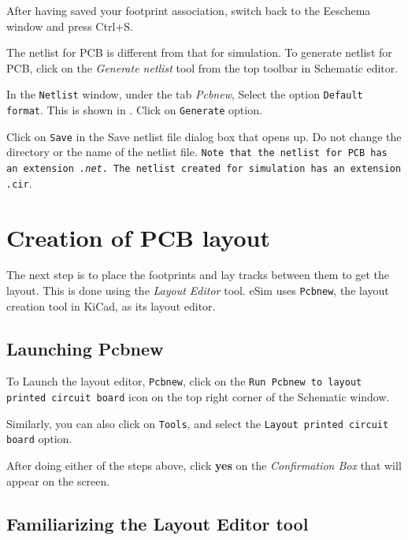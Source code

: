 \begin{compactenum}
\item After having saved your footprint association, switch back to the Eeschema window and press Ctrl+S.
\item The netlist for PCB is different from that for simulation. To generate
netlist for PCB, click on the \textit{Generate netlist} tool from the
top toolbar in Schematic editor.
\item In the \texttt{Netlist} window, under the tab \textit{Pcbnew}, Select the option \texttt{Default format}. This is shown in . Click on \texttt{Generate} option. 
\item Click on \texttt{Save} in the Save netlist file dialog box that opens up. Do not change the directory or the name of the netlist file. \texttt{Note that the netlist for PCB has an extension \emph{.net}. The netlist created for simulation has an extension \emph .cir}.
\end{compactenum}



\section{Creation of PCB layout}
 

The next step is to place the footprints and lay tracks between them
to get the layout. This is done using the \textit{Layout Editor}
tool. eSim uses {\tt Pcbnew}, the layout creation tool in KiCad, as
its layout editor.

\subsection{Launching Pcbnew}
\begin{compactenum}
\item To Launch the layout editor, \texttt{Pcbnew}, click on the \texttt{Run Pcbnew to layout printed circuit board} icon on the top right corner of the Schematic window.
\item Similarly, you can also click on \texttt{Tools}, and select the \texttt{Layout printed circuit board} option.
\item After doing either of the steps above, click \textbf{yes} on the \textit{Confirmation Box} that will appear on the screen.
\end{compactenum}

\subsection{Familiarizing the Layout Editor tool}

